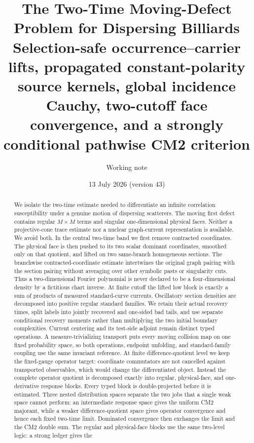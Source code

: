 \documentclass[11pt]{article}
\title{The Two-Time Moving-Defect Problem for Dispersing Billiards\\
\large Selection-safe occurrence--carrier lifts, propagated
constant-polarity source kernels,
global incidence Cauchy,
two-cutoff face convergence, and a strongly conditional
pathwise CM2 criterion}
\author{Working note}
\date{13 July 2026 (version 43)}
\begin{document}
\maketitle

\begin{abstract}
We isolate the two-time estimate needed to differentiate an infinite
correlation susceptibility under a genuine motion of dispersing scatterers.
The moving first defect contains regular $M\times M$ terms and singular
one-dimensional physical faces.  Neither a projective-cone trace estimate nor
a nuclear graph-current representation is available.  We avoid both.  In the
central two-time band we first remove contracted coordinates.  The physical
face is then pushed to its two scalar dominant coordinates, smoothed only on
that quotient, and lifted on two same-branch homogeneous sections.  The
branchwise contracted-coordinate estimate intertwines the original graph
pairing with the section pairing without averaging over other symbolic pasts
or singularity cuts.  Thus a two-dimensional Fourier polynomial is never
declared to be a four-dimensional density by a fictitious chart inverse.  At
finite cutoff the lifted low block is exactly a sum of products of measured
standard-curve currents.  Oscillatory section densities are decomposed into
positive regular standard families.  We retain their actual recovery times,
split labels into jointly recovered and one-sided bad tails, and use separate
conditional recovery moments rather than multiplying the two initial boundary
complexities.  Current centering and its test-side adjoint remain
distinct typed operations.  A measure-trivializing transport puts every
moving collision map on one fixed probability space, so both operations,
endpoint unfolding, and standard-family coupling use the same invariant
reference.  At finite difference-quotient level we keep the fixed-gauge
operator target: coordinate commutators are not cancelled against transported
observables, which would change the differentiated object.  Instead the
complete operator quotient is decomposed exactly into regular, physical-face,
and one-derivative response blocks.  Every typed block is double-projected
before it is estimated.  Three nested distribution spaces separate the two
jobs that a single weak space cannot perform: an intermediate response space
gives the uniform CM2 majorant, while a weaker difference-quotient space gives
operator convergence and hence each fixed two-time limit.  Dominated
convergence then exchanges the limit and the CM2 double sum.  The regular and
physical-face blocks use the same two-level logic: a strong ledger gives the

\end{abstract}
\end{document}
